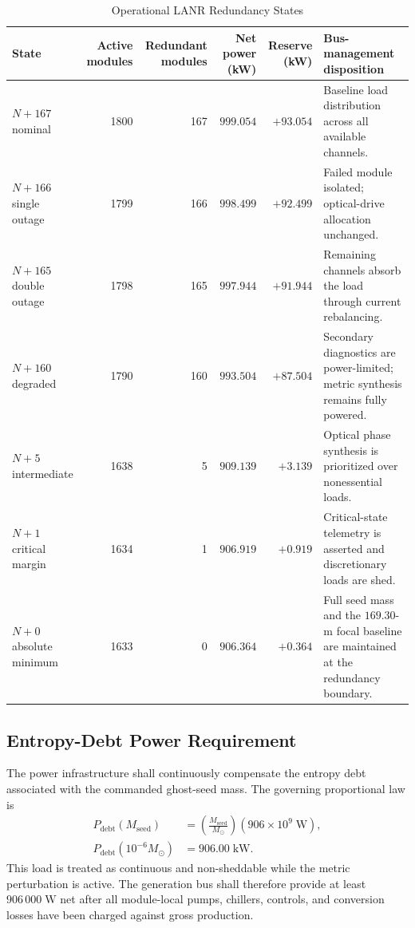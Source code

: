\documentclass[10pt,twocolumn]{IEEEtran}
\newcommand{\Msun}{M_{\odot}}
\begin{document}
\begin{table}[t]
\caption{Operational LANR Redundancy States}
\label{tab:lanr_redundancy_states}
\centering
\footnotesize
\begin{tabular}{@{}p{2.35cm}rrrrp{5.25cm}@{}}
\toprule
State & Active modules & Redundant modules & Net power (kW) & Reserve (kW) & Bus-management disposition \\
\midrule
$N+167$ nominal & 1800 & 167 & $999.054$ & $+93.054$ & Baseline load distribution across all available channels. \\
$N+166$ single outage & 1799 & 166 & $998.499$ & $+92.499$ & Failed module isolated; optical-drive allocation unchanged. \\
$N+165$ double outage & 1798 & 165 & $997.944$ & $+91.944$ & Remaining channels absorb the load through current rebalancing. \\
$N+160$ degraded & 1790 & 160 & $993.504$ & $+87.504$ & Secondary diagnostics are power-limited; metric synthesis remains fully powered. \\
$N+5$ intermediate & 1638 & 5 & $909.139$ & $+3.139$ & Optical phase synthesis is prioritized over nonessential loads. \\
$N+1$ critical margin & 1634 & 1 & $906.919$ & $+0.919$ & Critical-state telemetry is asserted and discretionary loads are shed. \\
$N+0$ absolute minimum & 1633 & 0 & $906.364$ & $+0.364$ & Full seed mass and the $169.30$-m focal baseline are maintained at the redundancy boundary. \\
\bottomrule
\end{tabular}
\end{table}

\subsection{Entropy-Debt Power Requirement}

The power infrastructure shall continuously compensate the entropy debt associated with the commanded ghost-seed mass.  The governing proportional law is
\begin{equation}
\begin{aligned}
P_{\mathrm{debt}}(M_{\mathrm{seed}})
&=\left(\frac{M_{\mathrm{seed}}}{\Msun}\right)
  \left(906\times10^{9}\;\mathrm{W}\right), \\
P_{\mathrm{debt}}(10^{-6}\Msun)
&=906.00\;\mathrm{kW}.
\end{aligned}
\label{eq:sec4_entropy_debt}
\end{equation}
This load is treated as continuous and non-sheddable while the metric perturbation is active.  The generation bus shall therefore provide at least $906\,000\;\mathrm{W}$ net after all module-local pumps, chillers, controls, and conversion losses have been charged against gross production.
\end{document}
